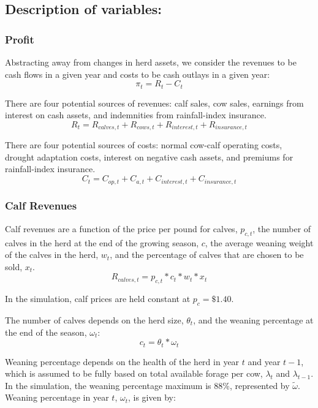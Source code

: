 \documentclass[11pt]{article}
\begin{document}
\subsection{Description of variables:}

\subsubsection{Profit}
Abstracting away from changes in herd assets, we consider the revenues to be cash flows in a given year and costs to be cash outlays in a given year:
\begin{equation}
\pi_t = R_t - C_t
\end{equation}

There are four potential sources of revenues: calf sales, cow sales, earnings from interest on cash assets, and indemnities from rainfall-index insurance.
\begin{equation}
R_t = R_{calves,t} + R_{cows,t} + R_{interest,t} + R_{insurance,t}
\end{equation}

There are four potential sources of costs: normal cow-calf operating costs, drought adaptation costs, interest on negative cash assets, and premiums for rainfall-index insurance.
\begin{equation}
C_t = C_{op,t} + C_{a,t} + C_{interest,t} + C_{insurance,t}
\end{equation}

\subsubsection{Calf Revenues}
Calf revenues are a function of the price per pound for calves, $p_{c,t}$, the number of calves in the herd at the end of the growing season, $c$, the average weaning weight of the calves in the herd, $w_t$, and the percentage of calves that are chosen to be sold, $x_t$.
\begin{equation}
R_{calves,t} = p_{c,t} * c_t * w_t * x_t 
\end{equation}

In the simulation, calf prices are held constant at $p_{c} = \$1.40$. 

The number of calves depends on the herd size, $\theta_t$, and the weaning percentage at the end of the season, $\omega_t$:
\begin{equation}
c_t = \theta_t * \omega_t
\end{equation}

Weaning percentage depends on the health of the herd in year $t$ and year $t-1$, which is assumed to be fully based on total available forage per cow, $\lambda_t$ and $\lambda_{t-1}$. In the simulation, the weaning percentage maximum is 88\%, represented by $\tilde{\omega}$. Weaning percentage in year $t$, $\omega_t$, is given by:\\
\end{document}
